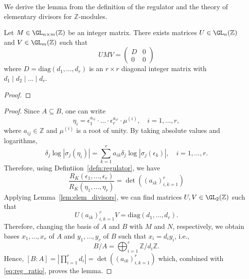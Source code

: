 We derive the lemma from the definition of the regulator and the theory of elementary divisors for 
$\mathbb{Z}$-modules.

\begin{lemma}\label{lem:elem_divisors}
    \leanok
    Let $M \in \GL_{n \times m}(\mathbb{Z})$ be an integer matrix. 
    There exists matrices $U \in \GL_n(\mathbb{Z})$ and 
    $V \in \GL_m(\mathbb{Z})$ such that 
    $$
    U M V = 
    \begin{pmatrix}
        D & 0 \\
        0 & 0 
    \end{pmatrix}
    $$ 
    where $D = \textrm{diag}(d_1, \dots, d_r)$ is an $r \times r$ 
    diagonal integer matrix with $d_1 \mid d_2 \mid \dots \mid d_r$.  
\end{lemma}

\begin{proof}
    \leanok
\end{proof}

\begin{proof}
    Since $A \subseteq B$, one can write 
    $$
    \eta_i = \epsilon_1^{a_{i1}} \cdot \dots \cdot \epsilon_r^{a_{i r}} \cdot \mu^{(i)}, \quad i = 1, \dots, r, 
    $$
    where $a_{ij} \in \mathbb{Z}$ and $\mu^{(i)}$ is a root of unity. By taking absolute values and logarithms, 
    $$
    \delta_j \log | \sigma_j(\eta_i) | = \sum_{k = 1}^r a_{ik} \delta_j \log | \sigma_j(\epsilon_k) |, \quad i = 1, \dots, r. 
    $$
    Therefore, using Defintiion~\ref{defn:regulator}, we have
    \begin{equation}\label{eq:reg_ratio}
    \frac{R_K(\epsilon_1, \dots, \epsilon_r)}{R_K(\eta_1, \dots, \eta_r)} = \det ((a_{ik})_{i, k = 1}^r)
    \end{equation}
    Applying Lemma~\ref{lem:elem_divisors}, we can find matrices $U, V \in \GL_2(\mathbb{Z})$ such that 
    $$
    U (a_{ik})_{i, k = 1}^r V = \text{diag}(d_1, \dots, d_r). 
    $$
    Therefore, changing the basis of $A$ and $B$ with $M$ and $N$, respectively, we obtain bases 
    $x_1, \dots, x_r$ of $A$ and $y_1, \dots, y_r$ of $B$ such that $x_i = d_i y_i$, i.e., 
    $$
    B / A = \bigoplus_{i = 1}^r \mathbb{Z} / d_i \mathbb{Z}. 
    $$
    Hence, $[B : A] = |\prod_{i = 1}^r d_i | = \det ((a_{ik})_{i, k = 1}^r)$ which, combined with \eqref{eq:reg_ratio}, 
    proves the lemma.  
\end{proof}


